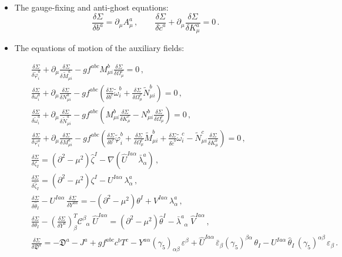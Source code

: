 \begin{appendix}
\begin{itemize}
\item{The gauge-fixing and anti-ghost equations:}
\begin{equation}
\frac{\delta\Sigma}{\delta b^{a}}=\partial_{\mu}A^{a}_{\mu}\,,\qquad
\frac{\delta\Sigma}{\delta\check{c}^{a}}+\partial_{\mu}\frac{\delta\Sigma}{\delta K^{a}_{\mu}}=0\,.
\label{GFandAntiGhost1}
\end{equation}

\item{The equations of motion of the auxiliary fields:}

\begin{eqnarray}
&&\frac{\delta \Sigma}{\delta \tilde{\varphi}^{a}_{i}} + \partial_{\mu}\frac{\delta\Sigma}{\delta \tilde{M}^{a}_{\mu i}} - gf^{abc}M^{b}_{\mu i}\frac{\delta\Sigma}{\delta\Omega^{c}_{\mu}} = 0 \,,
\\
&&\frac{\delta\Sigma}{\delta\omega^{a}_{i}} + \partial_{\mu}\frac{\delta\Sigma}{\delta N^{a}_{\mu i}} - gf^{abc} \left( \frac{\delta \Sigma}{\delta b^{c}} \tilde{\omega}^{b}_{i} + \frac{\delta \Sigma}{\delta \Omega^{c}_{\mu}}\tilde{N}^{b}_{\mu i} \right) = 0 \,,
\\
&&
\frac{\delta \Sigma}{\delta \tilde{\omega}^{a}_{i}} 
+ \partial_{\mu}\frac{\delta\Sigma}{\delta\tilde{N}^{a}_{\mu i}} 
- gf^{abc}\left( M^{b}_{\mu i}\frac{\delta\Sigma}{\delta K^{c}_{\mu}} 
- N^{b}_{\mu i} \frac{\delta\Sigma}{\delta\Omega^{c}_{\mu}} \right)=
0 \,,
\\
&&
\frac{\delta\Sigma}{\delta\varphi^{a}_{i}} 
+ \partial_{\mu}\frac{\delta\Sigma}{\delta M^{a}_{\mu i}} 
- gf^{abc}\left( \frac{\delta \Sigma}{\delta b^{c}}\tilde{\varphi}^{b}_{i} 
+ \frac{\delta \Sigma}{\delta \Omega^{c}_{\mu}}\tilde{M}^{b}_{\mu i} 
+ \frac{\delta \Sigma}{\delta \check{c}^{b}} \tilde{\omega}^{c}_{i} 
- \tilde{N}^{c}_{\mu i} \frac{\delta \Sigma}{\delta K^{b}_{\mu}} \right) = 0 \,,
\\
&&
\frac{\delta\Sigma}{\delta\zeta_{I}}=
(\partial^{2}-\mu^{2})\hat{\zeta}^{I}
- \nabla(\hat{U}^{Ia\alpha}\,\bar\lambda^{a}_{\alpha})\,,
\\
&&\frac{\delta\Sigma}{\delta\hat\zeta_{I}}=(\partial^{2}-\mu^{2}){\zeta}^{I}
-{U}^{Ia\alpha}\,\lambda^{a}_{\alpha}\,,
\\
&&\frac{\delta\Sigma}{\delta\hat\theta_{I}}
-{U}^{Ia\alpha}\,\frac{\delta\Sigma}{\delta Y^{a\alpha}}=-(\partial^{2}-\mu^{2}){\theta}^{I}
+{V}^{Ia\alpha}\,\lambda^{a}_{\alpha}\,,
\\
&&\frac{\delta\Sigma}{\delta\theta_{I}}
-\left(\frac{\delta\Sigma}{\delta Y^{a}}\right)^{T}_{\beta}\mathcal{C}^{\beta}_{\;\;\alpha}\;{\hat{U}}^{Ia\alpha}=(\partial^{2}-\mu^{2}){\hat\theta}^{I}
-\bar\lambda^{a}_{\;\;\alpha}\;{\hat{V}}^{Ia\alpha}\,,
\\
&&\frac{\delta\Sigma}{\delta{\mathfrak{D}^{a}}}=-\mathfrak{D}^{a}- J^{a} + gf^{abc}c^{b}T^{c}-Y^{a\alpha}(\gamma_{5})_{\alpha\beta}\,\varepsilon^{\beta}
+\hat{U}^{Ia\alpha}\,\bar{\varepsilon}_{\beta}(\gamma_{5})^{\beta\alpha}\,\theta_{I}
-U^{Ia\alpha}\,\hat\theta_{I}\,(\gamma_{5})^{\alpha\beta}\,\varepsilon_{\beta}\,.
\end{eqnarray}


\end{itemize}
\end{appendix}
